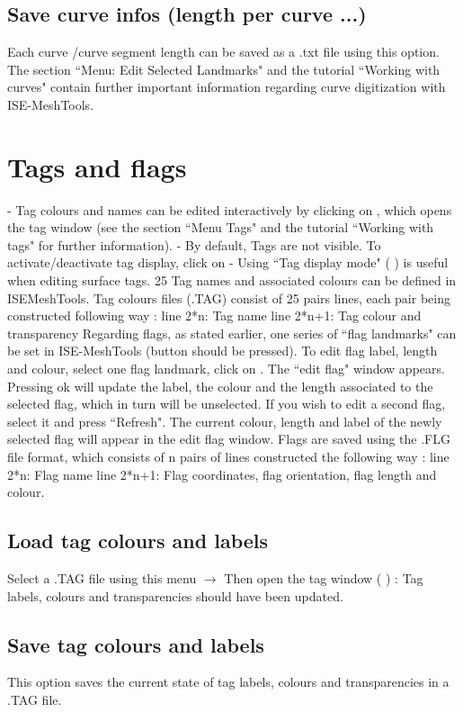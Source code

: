 \subsection{Save curve infos (length per curve ...)}
Each curve /curve segment length can be saved as a .txt file
using this option.
The section ``Menu: Edit Selected Landmarks" and the
tutorial ``Working with curves" contain further important
information regarding curve digitization with ISE-MeshTools.

\section{Tags and flags}
- Tag colours and names can be edited interactively by
clicking on , which opens the tag window (see the section
``Menu Tags" and the tutorial ``Working with tags" for
further information).
- By default, Tags are not visible. To activate/deactivate tag
display, click on
- Using ``Tag display mode" ( ) is useful when editing
surface tags.
25 Tag names and associated colours can be defined in ISEMeshTools.
Tag colours files (.TAG) consist of 25 pairs lines,
each pair being constructed following way :
line 2*n: Tag name
line 2*n+1: Tag colour and transparency
Regarding flags, as stated earlier, one series of ``flag
landmarks" can be set in ISE-MeshTools (button should
be pressed). To edit flag label, length and colour, select one
flag landmark, click on . The ``edit flag" window appears.
Pressing ok will update the label, the colour and the
length associated to the selected flag, which in turn will be
unselected. If you wish to edit a second flag, select it and press ``Refresh". The current colour, length
and label of the newly selected flag will appear in the edit flag window.
Flags are saved using the .FLG file format, which consists of n pairs of lines constructed the following
way :
line 2*n: Flag name
line 2*n+1: Flag coordinates, flag orientation, flag length and colour.

\subsection{Load tag colours and labels}
Select a .TAG file using this menu $\rightarrow$ Then open the tag window ( ) : Tag labels, colours and
transparencies should have been updated.
\subsection{Save tag colours and labels}
This option saves the current state of tag labels, colours and transparencies in a .TAG file.

